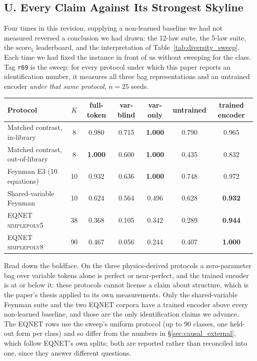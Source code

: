 \FloatBarrier
\subsection*{U. Every Claim Against Its Strongest Skyline}

Four times in this revision, supplying a non-learned baseline we had not measured reversed a
conclusion we had drawn: the 12-law suite, the 5-law suite, the $\mathrm{score}_5$ leaderboard, and
the interpretation of Table~\ref{tab:diversity_sweep}. Each time we had fixed the instance in front
of us without sweeping for the class. Tag \texttt{r69} is the sweep: for every protocol under which
this paper reports an identification number, it measures all three bag representations and an
untrained encoder \emph{under that same protocol}, $n{=}25$ seeds.

\begin{center}\small
\begin{tabular}{l c cccc c}
\toprule
Protocol & $K$ & full-token & var-blind & var-only & untrained & trained encoder \\
\midrule
Matched contrast, in-library      & 8  & 0.980 & 0.715 & \textbf{1.000} & 0.790 & 0.965 \\
Matched contrast, out-of-library  & 8  & \textbf{1.000} & 0.600 & \textbf{1.000} & 0.435 & 0.832 \\
Feynman E3 (10 equations)         & 10 & 0.932 & 0.636 & \textbf{1.000} & 0.748 & 0.972 \\
Shared-variable Feynman           & 10 & 0.624 & 0.564 & 0.496 & 0.628 & \textbf{0.932} \\
EQNET \textsc{simplepoly5}        & 38 & 0.368 & 0.105 & 0.342 & 0.289 & \textbf{0.944} \\
EQNET \textsc{simplepoly8}        & 90 & 0.467 & 0.056 & 0.244 & 0.407 & \textbf{1.000} \\
\bottomrule
\end{tabular}
\end{center}

Read down the boldface. On the three physics-derived protocols a zero-parameter bag over variable
tokens alone is perfect or near-perfect, and the trained encoder is at or below it: these
protocols cannot license a claim about structure, which is the paper's thesis applied to its own
measurements. Only the shared-variable Feynman suite and the two EQNET corpora have a trained
encoder above every non-learned baseline, and those are the only identification claims we
advance. The EQNET rows use the sweep's uniform protocol (up to 90 classes, one held-out form per
class) and so differ from the numbers in \S\ref{sec:causal_external}, which follow EQNET's own
splits; both are reported rather than reconciled into one, since they answer different questions.


